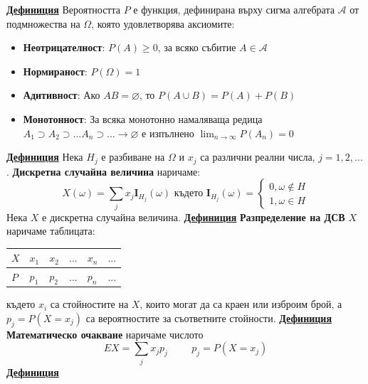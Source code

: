 \documentclass{article}
\begin{document}
\textbf{\underline{Дефиниция}}
Вероятността $P$ е функция, дефинирана върху сигма алгебрата $\mathcal{A}$ от подмножества на $\Omega$, която удовлетворява
аксиомите:
\begin{itemize}
    \item \textbf{Неотрицателност}: $P(A) \ge 0$, за всяко събитие $A \in \mathcal{A}$
    \item \textbf{Нормираност}: $P(\Omega) = 1$
    \item \textbf{Адитивност}: Ако $AB = \varnothing$, то $P(A \cup B) = P(A) + P(B)$
    \item \textbf{Монотонност}: За всяка монотонно намаляваща редица $A_1 \supset A_2 \supset ... A_n \supset ... \rightarrow \varnothing$ е изпълнено $\lim _{n \to \infty}P(A_n) = 0$
\end{itemize}
\textbf{\underline{Дефиниция}}
Нека $H_j$ е разбиване на $\Omega$ и $x_j$ са различни реални числа, $j = 1, 2, ...$.
\textbf{Дискретна случайна величина} наричаме:
$$X(\omega) = \sum_{j}x_j\mathbf{I}_{H_j}(\omega) \text{ където } \mathbf{I}_{H_j}(\omega) = \begin{cases}
    0, \omega \notin H \\
    1, \omega \in H
\end{cases}$$
Нека $X$ е дискретна случайна величина. \newline\newline
\textbf{\underline{Дефиниция}}
\textbf{Разпределение на ДСВ} $X$ наричаме таблицата:
\begin{center}
\begin{tabularx}{0.5\textwidth} { 
    | >{\centering\arraybackslash}X 
    | >{\centering\arraybackslash}X 
    | >{\centering\arraybackslash}X 
    | >{\centering\arraybackslash}X
    | >{\centering\arraybackslash}X
    | >{\centering\arraybackslash}X |}
   \hline
   $X$ & $x_1$ & $x_2$ & $...$ & $x_n$ & $...$ \\
   \hline
   $P$ & $p_1$ & $p_2$ & $...$ & $p_n$ & $...$  \\
   \hline
\end{tabularx}
\end{center}
където $x_i$ са стойностите на $X$, които могат да са краен или изброим брой, а $p_j = P(X = x_j)$ са вероятностите за
съответните стойности. \newline\newline
\textbf{\underline{Дефиниция}}
\textbf{Математическо очакване} наричаме числото $$EX = \sum_{j}x_jp_j \hspace{1cm} p_j = P(X = x_j)$$
\textbf{\underline{Дефиниция}}
\end{document}
